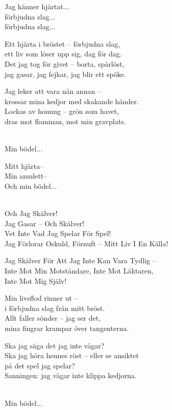 \begin{lyrics}
Jag känner hjärtat...\\
förbjudna slag...\\
förbjudna slag...

Ett hjärta i bröstet – förbjudna slag,\\
ett liv som löser upp sig, dag för dag.\\
Det jag tog för givet – borta, spårlöst,\\
jag gasar, jag fejkar, jag blir ett spöke.

Jag leker att vara nån annan –\\
krossar mina kedjor med skakande händer.\\
Lockas av honung – grön som havet,\\
dras mot flamman, mot min gravplats.

\\
Min bödel...

Mitt hjärta–\\
Min amulett–\\
Och min bödel...

\\
Och Jag Skälver!\\
Jag Gasar – Och Skälver!\\
Vet Inte Vad Jag Spelar För Spel!\\
Jag Förlorar Oskuld, Förnuft – Mitt Liv I En Källa!

Jag Skälver För Att Jag Inte Kan Vara Tydlig –\\
Inte Mot Min Motståndare, Inte Mot Läktaren,\\
Inte Mot Mig Själv!

Min livsflod rinner ut –\\
i förbjudna slag från mitt bröst.\\
Allt faller sönder – jag ser det,\\
mina fingrar krampar över tangenterna.

Ska jag säga det jag inte vågar?\\
Ska jag höra hennes röst – eller se ansiktet\\
på det spel jag spelar?\\
Sanningen: jag vågar inte klippa kedjorna.

\\
Min bödel...


\end{lyrics}
